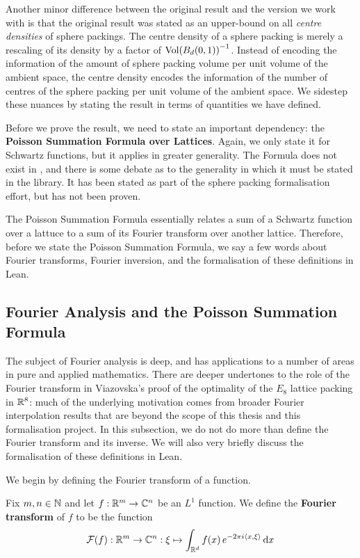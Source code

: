 Another minor difference between the original result and the version we work with is that the original result was stated as an upper-bound on all \textit{centre densities} of sphere packings. The centre density of a sphere packing is merely a rescaling of its density by a factor of $\operatorname{Vol}\!\left( B_d\!\left( 0, 1 \right) \right)^{-1}$. Instead of encoding the information of the amount of sphere packing volume per unit volume of the ambient space, the centre density encodes the information of the number of centres of the sphere packing per unit volume of the ambient space. We sidestep these nuances by stating the result in terms of quantities we have defined.

Before we prove the result, we need to state an important dependency: the \textbf{Poisson Summation Formula over Lattices}. Again, we only state it for Schwartz functions, but it applies in greater generality. The Formula does not exist in \mathlib, and there is some debate as to the generality in which it must be stated in the library. It has been stated as part of the sphere packing formalisation effort, but has not been proven.

The Poisson Summation Formula essentially relates a sum of a Schwartz function over a lattuce to a sum of its Fourier transform over another lattice. Therefore, before we state the Poisson Summation Formula, we say a few words about Fourier transforms, Fourier inversion, and the formalisation of these definitions in Lean.

\subsection{Fourier Analysis and the Poisson Summation Formula}

The subject of Fourier analysis is deep, and has applications to a number of areas in pure and applied mathematics. There are deeper undertones to the role of the Fourier transform in Viazovska's proof of the optimality of the $E_8$ lattice packing in $\mathbb{R}^8$: much of the underlying motivation comes from broader Fourier interpolation results that are beyond the scope of this thesis and this formalisation project. In this subsection, we do not do more than define the Fourier transform and its inverse. We will also very briefly discuss the formalisation of these definitions in Lean.

We begin by defining the Fourier transform of a function.

\begin{boxdefinition}\label{Ch2:Def:Fourier_Transform}
    Fix $m, n \in \mathbb{N}$ and let $f : \mathbb{R}^m \to \mathbb{C}^n$ be an $L^1$ function. We define the \textbf{Fourier transform} of $f$ to be the function
    \begin{align*}
        \mathcal{F}(f) : \mathbb{R}^m \to \mathbb{C}^n : \xi \mapsto \int_{\mathbb{R}^d} f\!\left( x \right) e^{-2 \pi i \left\langle x, \xi \right\rangle} \operatorname{d}\!x
    \end{align*}
\end{boxdefinition}

